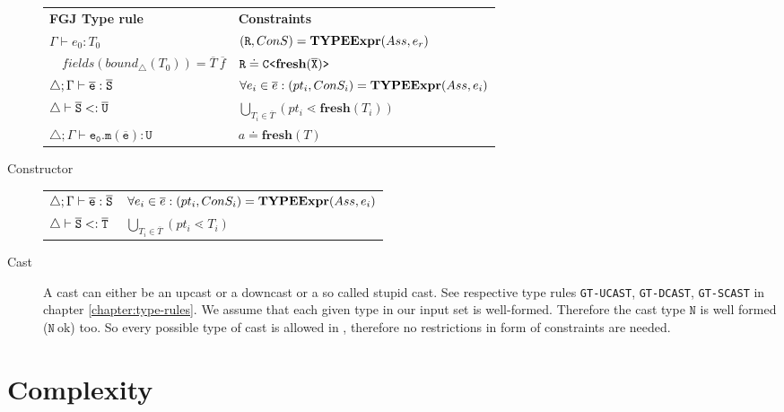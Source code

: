 \documentclass[a4paper,USenglish,cleveref, autoref, thm-restate, anonymous]{lipics-v2021}
\begin{document}
\begin{description}
 \begin{tabular}{l|l}
   \textbf{FGJ Type rule} & \textbf{Constraints} \\
   $\Gamma \vdash e_0:T_0$ & $(\texttt{R}, ConS) = \textbf{TYPEExpr}(Ass, e_r)$\\ 
   $\quad \mathit{fields}(\mathit{bound}_\triangle(T_0)) = \overline{T} \ \overline{f}$ & $\texttt{R} \doteq \mathtt{C \texttt{<} \textbf{fresh}(\overline{\tt X}) \texttt{>} }$ \\
  $\triangle; \Gamma \vdash \overline{\tt e} : \overline{\tt S}$ & $\forall e_i \in \overline{e} : (pt_i, ConS_i) = \textbf{TYPEExpr}(Ass, e_i)$\\
  $\triangle \vdash \overline{\tt S} <: \overline{\tt U}$ & $ \bigcup_{T_i \in \overline{T}} (pt_i \lessdot \textbf{fresh}(T_i))$\\
  $\triangle; \Gamma \vdash \mathtt{e_0.m(\overline{e}) : U }$ & $a \doteq \textbf{fresh}(T)$ \\
 \end{tabular}
 \fi
 \item[Constructor]

\begin{tabular}{l|l}
  $\triangle; \Gamma \vdash \overline{\tt e} : \overline{\tt S}$ & $\forall e_i \in \overline{e} : (pt_i, ConS_i) = \textbf{TYPEExpr}(Ass, e_i)$\\
  $\triangle \vdash \overline{\tt S} <: \overline{\tt T}$ & $\bigcup_{T_i \in \overline{T}} (pt_i \lessdot T_i)$
\end{tabular}

\item[Cast]
A cast can either be an upcast or a downcast or a so called stupid cast.
See respective type rules \texttt{GT-UCAST}, \texttt{GT-DCAST}, \texttt{GT-SCAST} in chapter \ref{chapter:type-rules}.
We assume that each given type in our input set is well-formed.
Therefore the cast type $\mathtt{N}$ is well formed ($\mathtt{N}\ \text{ok}$) too.
So every possible type of cast is allowed in \TFGJ, therefore no restrictions in form of constraints are needed.

\end{description}





\section{Complexity}
\label{sec:complexity}



%





%

\end{document}

